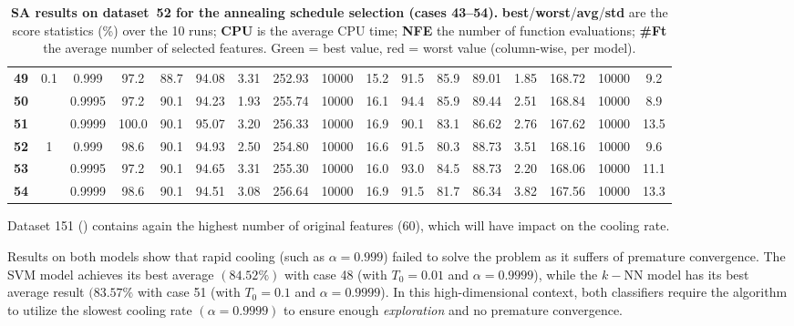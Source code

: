 \documentclass[12pt, openany]{article}
\begin{document}
\begin{table}[H]
{\begin{tabular}{|c|c|c|c c c c c c c|c c c c c c c|}
        \textbf{49} & \multirow{3}{*}{0.1} & 0.999 & 97.2 & 88.7 & 94.08 & 3.31 & 252.93 & 10000 & 15.2 & 91.5 & 85.9 & 89.01 & 1.85 & 168.72 & 10000 & 9.2 \\
        
        \textbf{50} & & 0.9995 & 97.2 & 90.1 & 94.23 & 1.93 & 255.74 & 10000 & 16.1 & 94.4 & 85.9 & \cellcolor{best}89.44 & 2.51 & 168.84 & 10000 & 8.9 \\
        
        \textbf{51} & & 0.9999 & \cellcolor{best}100.0 & 90.1 & \cellcolor{best}95.07 & 3.20 & 256.33 & 10000 & 16.9 & \cellcolor{worst}90.1 & 83.1 & 86.62 & 2.76 & 167.62 & 10000 & 13.5 \\

        \hdashline
        
        \textbf{52} & \multirow{3}{*}{1} & 0.999 & 98.6 & 90.1 & 94.93 & 2.50 & 254.80 & 10000 & 16.6 & 91.5 & 80.3 & 88.73 & 3.51 & 168.16 & 10000 & 9.6 \\
        
        \textbf{53} & & 0.9995 & 97.2 & 90.1 & 94.65 & 3.31 & 255.30 & 10000 & 16.0 & 93.0 & 84.5 & 88.73 & 2.20 & 168.06 & 10000 & 11.1 \\
        
        \textbf{54} & & 0.9999 & 98.6 & 90.1 & 94.51 & 3.08 & 256.64 & 10000 & 16.9 & 91.5 & 81.7 & 86.34 & 3.82 & 167.56 & 10000 & 13.3 \\
        \hline
    \end{tabular}
    }
    \caption{\textbf{SA results on dataset~52 for the annealing schedule selection (cases 43--54).} \textbf{best}/\textbf{worst}/\textbf{avg}/\textbf{std} are the score statistics (\%) over the 10 runs; \textbf{CPU} is the average CPU time; \textbf{NFE} the number of function evaluations; \textbf{\#Ft} the average number of selected features. Green = best value, red = worst value (column-wise, per model).}
    \label{tab:results_SA_schedule_d52}
\end{table}

Dataset 151 () contains again the highest number of original features (60), which will have impact on the cooling rate.

Results on both models show that rapid cooling (such as $\alpha=0.999$) failed to solve the problem as it suffers of premature convergence. The SVM model achieves its best average $(84.52\%)$ with case 48 (with $T_0=0.01$ and $\alpha=0.9999$), while the $k-$NN model has its best average result $(83.57\%$ with case 51 (with $T_0=0.1$ and $\alpha=0.9999$). In this high-dimensional context, both classifiers require the algorithm to utilize the slowest cooling rate $(\alpha=0.9999)$ to ensure enough \emph{exploration} and no premature convergence.
\end{document}
